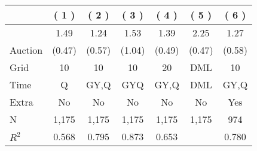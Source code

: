 
\begin{tabular}{lcccccc}
\toprule
 & ( 1 ) & ( 2 ) & ( 3 ) & ( 4 ) & ( 5 ) & ( 6 )\\
\midrule
 & 1.49 & 1.24 & 1.53 & 1.39 & 2.25 & 1.27\\

\multirow{-2}{*}{\raggedright\arraybackslash Auction} & (0.47) & (0.57) & (1.04) & (0.49) & (0.47) & (0.58)\\

\midrule
Grid & 10 & 10 & 10 & 20 & DML & 10\\

Time & Q & GY,Q & GYQ & GY,Q & DML & GY,Q\\

Extra & No & No & No & No & No & Yes\\

N & 1,175 & 1,175 & 1,175 & 1,175 & 1,175 & 974\\

$R^2$ & 0.568 & 0.795 & 0.873 & 0.653 &  & 0.780\\
\bottomrule
\end{tabular}
